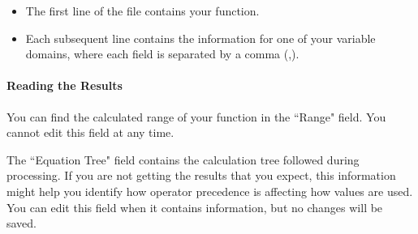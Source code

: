 \documentclass[12pt]{article}
\begin{document}
\begin{itemize}
	\item The first line of the file contains your function.
	\item Each subsequent line contains the information for one of your 
	variable domains, where each field is separated by a comma (,).
\end{itemize}

\paragraph{Reading the Results\\}
You can find the calculated range of your function in the ``Range" field. You 
cannot edit this field at any time.

The ``Equation Tree" field contains the calculation tree followed during 
processing. If you are not getting the results that you expect, this 
information might help you identify how operator precedence is affecting how 
values are used. You can edit this field when it contains information, but no 
changes will be saved.
\end{document}
